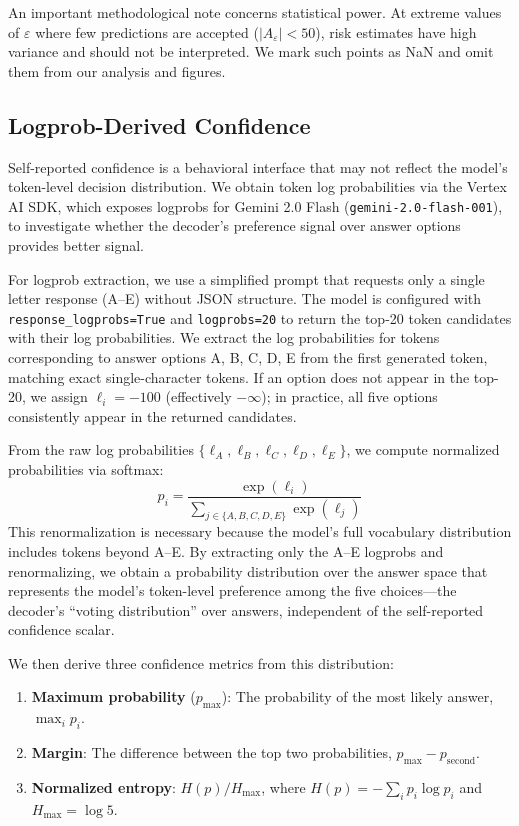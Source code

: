 \documentclass{article}
\begin{document}
An important methodological note concerns statistical power. At extreme values of $\varepsilon$ where few predictions are accepted ($|A_\varepsilon| < 50$), risk estimates have high variance and should not be interpreted. We mark such points as NaN and omit them from our analysis and figures.

\subsection{Logprob-Derived Confidence}
\label{sec:logprob-method}

Self-reported confidence is a behavioral interface that may not reflect the model's token-level decision distribution. We obtain token log probabilities via the Vertex AI SDK, which exposes logprobs for Gemini 2.0 Flash (\texttt{gemini-2.0-flash-001}), to investigate whether the decoder's preference signal over answer options provides better signal.

For logprob extraction, we use a simplified prompt that requests only a single letter response (A--E) without JSON structure. The model is configured with \texttt{response\_logprobs=True} and \texttt{logprobs=20} to return the top-20 token candidates with their log probabilities. We extract the log probabilities for tokens corresponding to answer options A, B, C, D, E from the first generated token, matching exact single-character tokens. If an option does not appear in the top-20, we assign $\ell_i = -100$ (effectively $-\infty$); in practice, all five options consistently appear in the returned candidates.

From the raw log probabilities $\{\ell_A, \ell_B, \ell_C, \ell_D, \ell_E\}$, we compute normalized probabilities via softmax:
\begin{equation}
p_i = \frac{\exp(\ell_i)}{\sum_{j \in \{A,B,C,D,E\}} \exp(\ell_j)}
\end{equation}
This renormalization is necessary because the model's full vocabulary distribution includes tokens beyond A--E. By extracting only the A--E logprobs and renormalizing, we obtain a probability distribution over the answer space that represents the model's token-level preference among the five choices---the decoder's ``voting distribution'' over answers, independent of the self-reported confidence scalar.

We then derive three confidence metrics from this distribution:
\begin{enumerate}
    \item \textbf{Maximum probability} ($p_{\max}$): The probability of the most likely answer, $\max_i p_i$.
    \item \textbf{Margin}: The difference between the top two probabilities, $p_{\max} - p_{\text{second}}$.
    \item \textbf{Normalized entropy}: $H(p)/H_{\max}$, where $H(p) = -\sum_i p_i \log p_i$ and $H_{\max} = \log 5$.
\end{enumerate}
\end{document}

